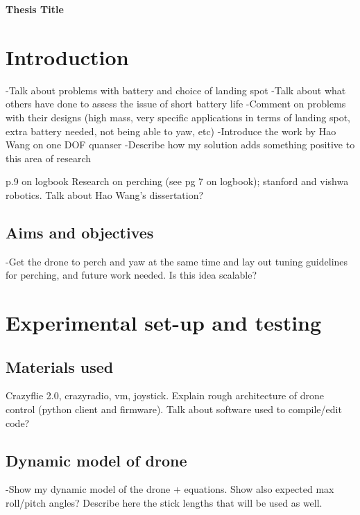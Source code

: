 \documentclass[12pt,a4paper]{article}
\begin{document}
\begin{titlepage}
	\begin{center}
	\textbf{Thesis Title}
	\end{center}
\end{titlepage}


\setcounter{page}{2}

\tableofcontents

\pagebreak

\listoffigures

\pagebreak

\listoftables

\pagebreak
\section{Introduction}
-Talk about problems with battery and choice of landing spot
	-Talk about what others have done to assess the issue of short battery life
	-Comment on problems with their designs (high mass, very specific applications in terms of landing spot, extra battery needed, not being able to yaw, etc)
	-Introduce the work by Hao Wang on one DOF quanser
	-Describe how my solution adds something positive to this area of research

p.9 on logbook
Research on perching (see pg 7 on logbook); stanford and vishwa robotics. Talk about Hao Wang's dissertation?
\subsection{Aims and objectives}
-Get the drone to perch and yaw at the same time and lay out tuning guidelines for perching, and future work needed. Is this idea scalable?
\section{Experimental set-up and testing}
\subsection{Materials used}
	Crazyflie 2.0, crazyradio, vm, joystick. Explain rough architecture of drone control (python client and firmware). Talk about software used to compile/edit code?
\subsection{Dynamic model of drone}
-Show my dynamic model of the drone + equations. Show also expected max roll/pitch angles? Describe here the stick lengths that will be used as well.
\end{document}
